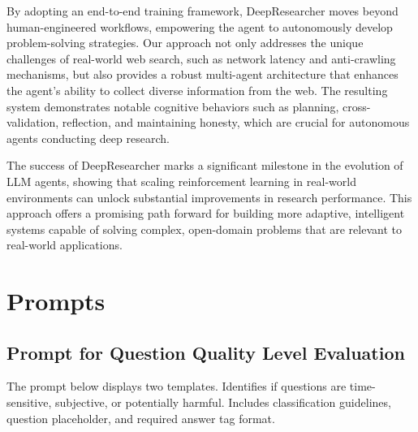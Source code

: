 \documentclass{article}
\newcommand{\scrl}{DeepResearcher\xspace}
\begin{document}
By adopting an end-to-end training framework, \scrl moves beyond human-engineered workflows, empowering the agent to autonomously develop problem-solving strategies. Our approach not only addresses the unique challenges of real-world web search, such as network latency and anti-crawling mechanisms, but also provides a robust multi-agent architecture that enhances the agent’s ability to collect diverse information from the web. The resulting system demonstrates notable cognitive behaviors such as planning, cross-validation, reflection, and maintaining honesty, which are crucial for autonomous agents conducting deep research.

The success of \scrl marks a significant milestone in the evolution of LLM agents, showing that scaling reinforcement learning in real-world environments can unlock substantial improvements in research performance. This approach offers a promising path forward for building more adaptive, intelligent systems capable of solving complex, open-domain problems that are relevant to real-world applications.



\appendix

\section{Prompts}

\subsection{Prompt for Question Quality Level Evaluation}
\label{appendix:prompt_quality_control}

The prompt below displays two templates. Identifies if questions are time-sensitive, subjective, or potentially harmful. Includes classification guidelines, question placeholder, and required answer tag format.
\end{document}
